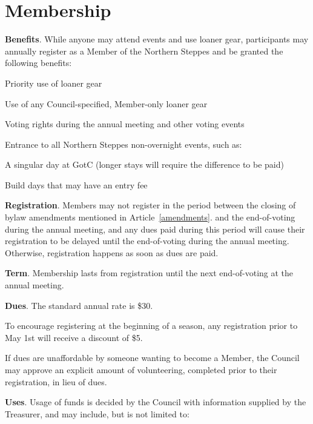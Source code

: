 \documentclass[12pt]{article}
\begin{document}
\section{Membership}
\begin{level}
    \item \textbf{Benefits}. While anyone may attend events and use loaner gear, participants may annually register as a Member of the Northern Steppes and be granted the following benefits:
    \begin{level}
        \item Priority use of loaner gear
        \item Use of any Council-specified, Member-only loaner gear
        \item Voting rights during the annual meeting and other voting events
        \item Entrance to all Northern Steppes non-overnight events, such as:
        \begin{level}
            \item A singular day at GotC (longer stays will require the difference to be paid)
            \item Build days that may have an entry fee
        \end{level}
    \end{level}
    \item \textbf{Registration}. Members may not register in the period between the closing of bylaw amendments mentioned in Article~\ref{amendments}. and the end-of-voting during the annual meeting, and any dues paid during this period will cause their registration to be delayed until the end-of-voting during the annual meeting. Otherwise, registration happens as soon as dues are paid.
    \item \textbf{Term}. Membership lasts from registration until the next end-of-voting at the annual meeting. 
    \item \textbf{Dues}. The standard annual rate is \$30.
    \begin{level}
        \item To encourage registering at the beginning of a season, any registration prior to May 1st will receive a discount of \$5. 
        \item If dues are unaffordable by someone wanting to become a Member, the Council may approve an explicit amount of volunteering, completed prior to their registration, in lieu of dues.
    \end{level}
    \item \textbf{Uses}. Usage of funds is decided by the Council with information supplied by the Treasurer, and may include, but is not limited to:

\end{level}
\end{document}
